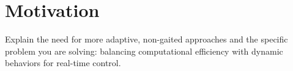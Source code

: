 \section{Motivation}

\begin{outline}
  Explain the need for more adaptive, non-gaited approaches and the specific problem you are solving: balancing computational efficiency with dynamic behaviors for real-time control.
\end{outline}
